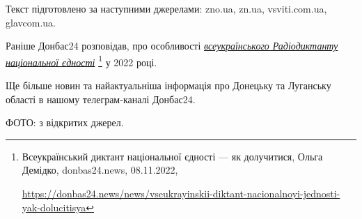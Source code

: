 Текст підготовлено за наступними джерелами: zno.ua, zn.ua, vsviti.com.ua,
glavcom.ua.

Раніше Донбас24 розповідав, про особливості \href{https://donbas24.news/news/vseukrayinskii-diktant-nacionalnoyi-jednosti-yak-dolucitisya}{\emph{всеукраїнського Радіодиктанту національної єдності}}%
\footnote{Всеукраїнський диктант національної єдності — як долучитися, Ольга Демідко, donbas24.news, 08.11.2022, \par\url{https://donbas24.news/news/vseukrayinskii-diktant-nacionalnoyi-jednosti-yak-dolucitisya}} у 2022 році.

Ще більше новин та найактуальніша інформація про Донецьку та Луганську області
в нашому телеграм-каналі Донбас24.

ФОТО: з відкритих джерел.

